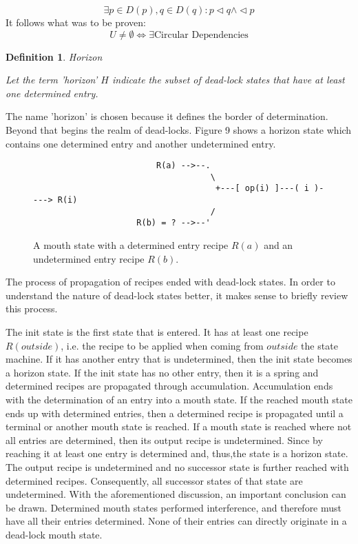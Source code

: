\documentclass[12pt,a4paper]{scrartcl}
\theoremstyle{break}
\newtheorem{definition}{Definition}
\begin{document}
\begin{equation}
    \exists p \in D(p), q \in D(q): p \vartriangleleft q \wedge \vartriangleleft p
\end{equation}
It follows what was to be proven:
\begin{equation}
    U \neq \emptyset \Leftrightarrow \exists \mbox{Circular Dependencies} 
\end{equation}

\begin{definition}
Horizon

Let the term 'horizon' $H$ indicate the subset of dead-lock states that have
at least one determined entry.
\end{definition}

The name 'horizon' is chosen because it defines the border of determination.
Beyond that begins the realm of dead-locks. Figure 9 shows a horizon state
which contains one determined entry and another undetermined entry.

\begin{figure}[htbp] \leavevmode
\begin{verbatim}
                         R(a) -->--.
                                    \
                                     +---[ op(i) ]---( i )----> R(i)
                                    /
                     R(b) = ? -->--'

\end{verbatim}
\caption{A mouth state with a determined entry recipe $R(a)$ and 
an undetermined entry recipe $R(b)$.}
\end{figure}

The process of propagation of recipes ended with dead-lock states. In order
to understand the nature of dead-lock states better, it makes sense to briefly
review this process. 

The init state is the first state that is entered. It has at least one recipe
$R(outside)$, i.e. the recipe to be applied when coming from $outside$ the
state machine. If it has another entry that is undetermined, then the init
state becomes a horizon state. If the init state has no other entry, then it is
a spring and determined recipes are propagated through accumulation.
Accumulation ends with the determination of an entry into a mouth state. If the
reached mouth state ends up with determined entries, then a determined recipe
is propagated until a terminal or another mouth state is reached. If a mouth
state is reached where not all entries are determined, then its output recipe
is undetermined. Since by reaching it at least one entry is determined and,
thus,the state is a horizon state. The output recipe is undetermined and no
successor state is further reached with determined recipes. Consequently, all
successor states of that state are undetermined.  With the aforementioned
discussion, an important conclusion can be drawn.  Determined mouth states 
performed interference, and therefore must have all their entries determined. 
None of their entries can directly originate in a dead-lock mouth state.
\end{document}

